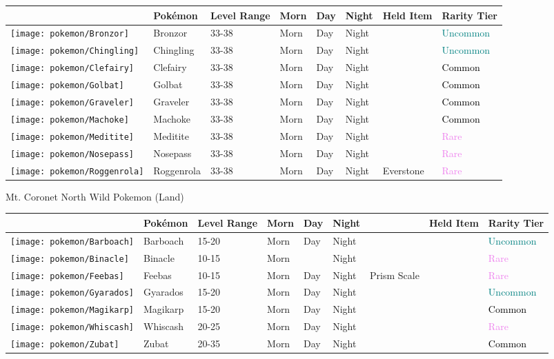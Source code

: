 \begin{longtable}{||l l l l l l l l||}%
\hline%
&Pokémon&Level Range&Morn&Day&Night&Held Item&Rarity Tier\\%
\hline%
\endhead%
\hline%
\texttt{[image: pokemon/Bronzor]}&Bronzor&33{-}38&Morn&Day&Night&&\textcolor{teal}{%
Uncommon%
}\\%
\hline%
\texttt{[image: pokemon/Chingling]}&Chingling&33{-}38&Morn&Day&Night&&\textcolor{teal}{%
Uncommon%
}\\%
\hline%
\texttt{[image: pokemon/Clefairy]}&Clefairy&33{-}38&Morn&Day&Night&&\textcolor{black}{%
Common%
}\\%
\hline%
\texttt{[image: pokemon/Golbat]}&Golbat&33{-}38&Morn&Day&Night&&\textcolor{black}{%
Common%
}\\%
\hline%
\texttt{[image: pokemon/Graveler]}&Graveler&33{-}38&Morn&Day&Night&&\textcolor{black}{%
Common%
}\\%
\hline%
\texttt{[image: pokemon/Machoke]}&Machoke&33{-}38&Morn&Day&Night&&\textcolor{black}{%
Common%
}\\%
\hline%
\texttt{[image: pokemon/Meditite]}&Meditite&33{-}38&Morn&Day&Night&&\textcolor{violet}{%
Rare%
}\\%
\hline%
\texttt{[image: pokemon/Nosepass]}&Nosepass&33{-}38&Morn&Day&Night&&\textcolor{violet}{%
Rare%
}\\%
\hline%
\texttt{[image: pokemon/Roggenrola]}&Roggenrola&33{-}38&Morn&Day&Night&Everstone&\textcolor{violet}{%
Rare%
}\\%
\hline%
\end{longtable}%
\caption{Mt. Coronet North Wild Pokemon (Land)}%
\begin{longtable}{||l l l l l l l l l||}%
\hline%
&Pokémon&Level Range&Morn&Day&Night&&Held Item&Rarity Tier\\%
\hline%
\endhead%
\hline%
\texttt{[image: pokemon/Barboach]}&Barboach&15{-}20&Morn&Day&Night&&&\textcolor{teal}{%
Uncommon%
}\\%
\hline%
\texttt{[image: pokemon/Binacle]}&Binacle&10{-}15&Morn&&Night&&&\textcolor{violet}{%
Rare%
}\\%
\hline%
\texttt{[image: pokemon/Feebas]}&Feebas&10{-}15&Morn&Day&Night&Prism Scale&&\textcolor{violet}{%
Rare%
}\\%
\hline%
\texttt{[image: pokemon/Gyarados]}&Gyarados&15{-}20&Morn&Day&Night&&&\textcolor{teal}{%
Uncommon%
}\\%
\hline%
\texttt{[image: pokemon/Magikarp]}&Magikarp&15{-}20&Morn&Day&Night&&&\textcolor{black}{%
Common%
}\\%
\hline%
\texttt{[image: pokemon/Whiscash]}&Whiscash&20{-}25&Morn&Day&Night&&&\textcolor{violet}{%
Rare%
}\\%
\hline%
\texttt{[image: pokemon/Zubat]}&Zubat&20{-}35&Morn&Day&Night&&&\textcolor{black}{%
Common%
}\\%
\hline%
\end{longtable}%
